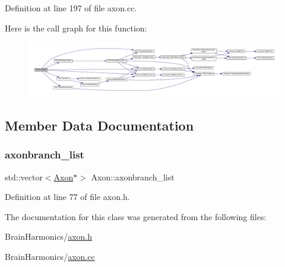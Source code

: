 Definition at line 197 of file axon.\+cc.

Here is the call graph for this function\+:\nopagebreak
\begin{figure}[H]
\begin{center}
\leavevmode
\includegraphics[width=350pt]{class_axon_a472ee760a1727072afaff0035d1eedd9_cgraph}
\end{center}
\end{figure}


\subsection{Member Data Documentation}
\mbox{\label{class_axon_ab32c0e4335cc4da8fe1aace7c16a88bf}} 
\subsubsection{\texorpdfstring{axonbranch\+\_\+list}{axonbranch\_list}}
{\footnotesize\ttfamily std\+::vector$<$\mbox{\hyperlink{class_axon}{Axon}}$\ast$$>$ Axon\+::axonbranch\+\_\+list\hspace{0.3cm}{\ttfamily [protected]}}



Definition at line 77 of file axon.\+h.



The documentation for this class was generated from the following files\+:\begin{DoxyCompactItemize}
\item 
Brain\+Harmonics/\mbox{\hyperlink{axon_8h}{axon.\+h}}\item 
Brain\+Harmonics/\mbox{\hyperlink{axon_8cc}{axon.\+cc}}\end{DoxyCompactItemize}
